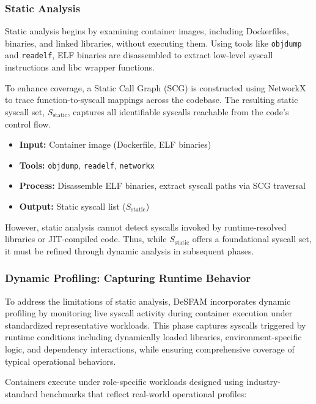 \subsubsection{Static Analysis}
\label{subsubsec:static_analysis}

Static analysis begins by examining container images, including Dockerfiles, binaries, and
linked libraries, without executing them. Using tools like \texttt{objdump} and \texttt{readelf},
ELF binaries are disassembled to extract low-level syscall instructions and libc wrapper
functions.

To enhance coverage, a Static Call Graph (SCG) is constructed using NetworkX to trace
function-to-syscall mappings across the codebase. The resulting static syscall set,
$S_{\text{static}}$, captures all identifiable syscalls reachable from the code's control flow.

\begin{itemize}
  \item \textbf{Input:} Container image (Dockerfile, ELF binaries)
  \item \textbf{Tools:} \texttt{objdump}, \texttt{readelf}, \texttt{networkx}
  \item \textbf{Process:} Disassemble ELF binaries, extract syscall paths via SCG traversal
  \item \textbf{Output:} Static syscall list ($S_{\text{static}}$)
\end{itemize}

However, static analysis cannot detect syscalls invoked by runtime-resolved libraries or
JIT-compiled code. Thus, while $S_{\text{static}}$ offers a foundational syscall set, it must
be refined through dynamic analysis in subsequent phases.

\subsubsection{Dynamic Profiling: Capturing Runtime Behavior}
\label{subsubsec:dynamic_profiling}

To address the limitations of static analysis, DeSFAM incorporates dynamic profiling by
monitoring live syscall activity during container execution under standardized representative
workloads. This phase captures syscalls triggered by runtime conditions including dynamically
loaded libraries, environment-specific logic, and dependency interactions, while ensuring
comprehensive coverage of typical operational behaviors.

Containers execute under role-specific workloads designed using industry-standard benchmarks
that reflect real-world operational profiles:

